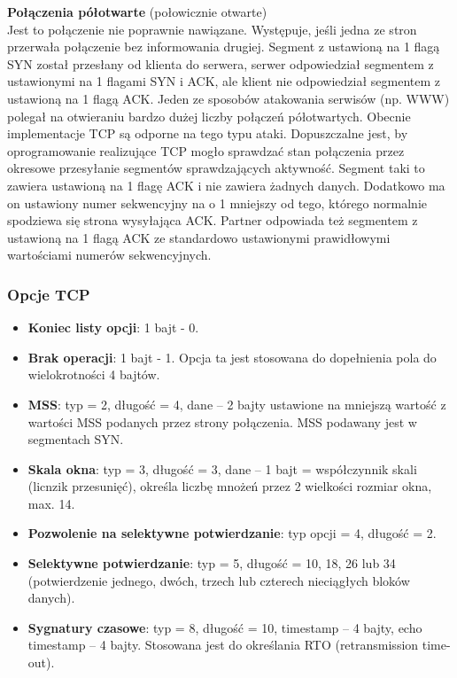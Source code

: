 \documentclass[../main.tex]{subfiles}
\begin{document}
    \textbf{Połączenia półotwarte} (połowicznie otwarte)\\
    Jest to połączenie nie poprawnie nawiązane. Występuje, jeśli jedna ze stron przerwała połączenie bez informowania drugiej. Segment z ustawioną na 1 flagą SYN został przesłany od
    klienta do serwera, serwer odpowiedział segmentem z ustawionymi na 1 flagami SYN i ACK,
    ale klient nie odpowiedział segmentem z ustawioną na 1 flagą ACK.
    Jeden ze sposobów atakowania serwisów (np. WWW) polegał na otwieraniu bardzo dużej
    liczby połączeń półotwartych. Obecnie implementacje TCP są odporne na tego typu ataki.
    Dopuszczalne jest, by oprogramowanie realizujące TCP mogło sprawdzać stan połączenia
    przez okresowe przesyłanie segmentów sprawdzających aktywność. Segment taki to zawiera
    ustawioną na 1 flagę ACK i nie zawiera żadnych danych. Dodatkowo ma on ustawiony numer
    sekwencyjny na o 1 mniejszy od tego, którego normalnie spodziewa się strona wysyłająca
    ACK. Partner odpowiada też segmentem z ustawioną na 1 flagą ACK ze standardowo
    ustawionymi prawidłowymi wartościami numerów sekwencyjnych.


    \subsubsection{Opcje TCP}
    \begin{itemize}
        \item \textbf{Koniec listy opcji}: 1 bajt - 0.
        \item \textbf{Brak operacji}: 1 bajt - 1. Opcja ta jest stosowana do dopełnienia pola do wielokrotności 4 bajtów.
        \item \textbf{MSS}: typ = 2, długość = 4, dane – 2 bajty ustawione na mniejszą wartość z wartości MSS podanych przez strony połączenia. MSS podawany jest w segmentach SYN.
        \item \textbf{Skala okna}: typ = 3, długość = 3, dane – 1 bajt = współczynnik skali (licnzik przesunięć), określa liczbę mnożeń przez 2 wielkości rozmiar okna, max. 14.
        \item \textbf{Pozwolenie na selektywne potwierdzanie}: typ opcji = 4, długość = 2.
        \item \textbf{Selektywne potwierdzanie}: typ = 5, długość = 10, 18, 26 lub 34 (potwierdzenie jednego, dwóch, trzech lub czterech nieciągłych bloków danych).
        \item \textbf{Sygnatury czasowe}: typ = 8, długość = 10, timestamp – 4 bajty, echo timestamp – 4 bajty.
        Stosowana jest do określania RTO (retransmission time-out).

    \end{itemize}
\end{document}
